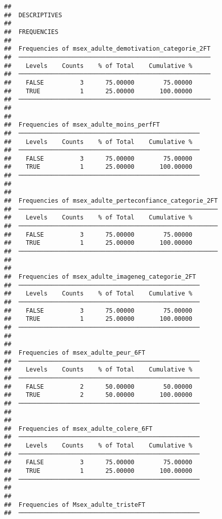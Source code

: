 \documentclass[
]{article}
\begin{document}
\begin{verbatim}
## 
##  DESCRIPTIVES
## 
##  FREQUENCIES
## 
##  Frequencies of msex_adulte_demotivation_categorie_2FT 
##  ───────────────────────────────────────────────────── 
##    Levels    Counts    % of Total    Cumulative %   
##  ───────────────────────────────────────────────────── 
##    FALSE          3      75.00000        75.00000   
##    TRUE           1      25.00000       100.00000   
##  ───────────────────────────────────────────────────── 
## 
## 
##  Frequencies of msex_adulte_moins_perfFT            
##  ────────────────────────────────────────────────── 
##    Levels    Counts    % of Total    Cumulative %   
##  ────────────────────────────────────────────────── 
##    FALSE          3      75.00000        75.00000   
##    TRUE           1      25.00000       100.00000   
##  ────────────────────────────────────────────────── 
## 
## 
##  Frequencies of msex_adulte_perteconfiance_categorie_2FT 
##  ─────────────────────────────────────────────────────── 
##    Levels    Counts    % of Total    Cumulative %   
##  ─────────────────────────────────────────────────────── 
##    FALSE          3      75.00000        75.00000   
##    TRUE           1      25.00000       100.00000   
##  ─────────────────────────────────────────────────────── 
## 
## 
##  Frequencies of msex_adulte_imageneg_categorie_2FT  
##  ────────────────────────────────────────────────── 
##    Levels    Counts    % of Total    Cumulative %   
##  ────────────────────────────────────────────────── 
##    FALSE          3      75.00000        75.00000   
##    TRUE           1      25.00000       100.00000   
##  ────────────────────────────────────────────────── 
## 
## 
##  Frequencies of msex_adulte_peur_6FT                
##  ────────────────────────────────────────────────── 
##    Levels    Counts    % of Total    Cumulative %   
##  ────────────────────────────────────────────────── 
##    FALSE          2      50.00000        50.00000   
##    TRUE           2      50.00000       100.00000   
##  ────────────────────────────────────────────────── 
## 
## 
##  Frequencies of msex_adulte_colere_6FT              
##  ────────────────────────────────────────────────── 
##    Levels    Counts    % of Total    Cumulative %   
##  ────────────────────────────────────────────────── 
##    FALSE          3      75.00000        75.00000   
##    TRUE           1      25.00000       100.00000   
##  ────────────────────────────────────────────────── 
## 
## 
##  Frequencies of Msex_adulte_tristeFT                
##  ────────────────────────────────────────────────── 

\end{verbatim}
\end{document}
